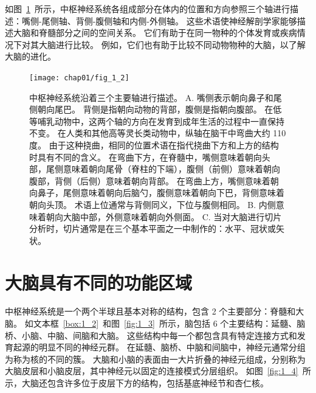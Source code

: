 \begin{proposition}[神经解剖学导航术语] \label{box:1_1}
	
	\quad \quad 如图~\ref{fig:1_2}~所示，中枢神经系统各组成部分在体内的位置和方向参照三个轴进行描述：嘴侧-尾侧轴、背侧-腹侧轴和内侧-外侧轴。
	这些术语使神经解剖学家能够描述大脑和脊髓部分之间的空间关系。
	它们有助于在同一物种的个体发育或疾病情况下对其大脑进行比较。
	例如，它们也有助于比较不同动物物种的大脑，以了解大脑的进化。

\end{proposition}


\begin{figure}[htbp]
	\centering
	\texttt{[image: chap01/fig\_1\_2]}
	\caption{中枢神经系统沿着三个主要轴进行描述\cite{martin2012neuroanatomy}。 
		A. 嘴侧表示朝向鼻子和尾侧朝向尾巴。
		背侧是指朝向动物的背部，腹侧是指朝向腹部。
		在低等哺乳动物中，这两个轴的方向在发育到成年生活的过程中一直保持不变。
		在人类和其他高等灵长类动物中，纵轴在脑干中弯曲大约 110 度。
		由于这种挠曲，相同的位置术语在指代挠曲下方和上方的结构时具有不同的含义。
		在弯曲下方，在脊髓中，嘴侧意味着朝向头部，尾侧意味着朝向尾骨（脊柱的下端），腹侧（前侧）意味着朝向腹部，背侧（后侧）意味着朝向背部。
		在弯曲上方，嘴侧意味着朝向鼻子，尾侧意味着朝向后脑勺，腹侧意味着朝向下巴，背侧意味着朝向头顶。
		术语上位通常与背侧同义，下位与腹侧相同。
		B. 内侧意味着朝向大脑中部，外侧意味着朝向外侧面。
		C. 当对大脑进行切片分析时，切片通常是在三个基本平面之一中制作的：水平、冠状或矢状。}
	\label{fig:1_2}
\end{figure}



\section{大脑具有不同的功能区域}

中枢神经系统是一个两个半球且基本对称的结构，包含 2 个主要部分：脊髓和大脑。
如文本框~\ref{box:1_2}~和图~\ref{fig:1_3}~所示，脑包括 6 个主要结构：延髓、脑桥、小脑、中脑、间脑和大脑。
这些结构中每一个都包含具有特定连接方式和发育起源的明显不同的神经元群。
在延髓、脑桥、中脑和间脑中，神经元通常分组为称为核的不同的簇。
大脑和小脑的表面由一大片折叠的神经元组成，分别称为大脑皮层和小脑皮层，其中神经元以固定的连接模式分层组织。
如图~\ref{fig:1_4}~所示，大脑还包含许多位于皮层下方的结构，包括基底神经节和杏仁核。


